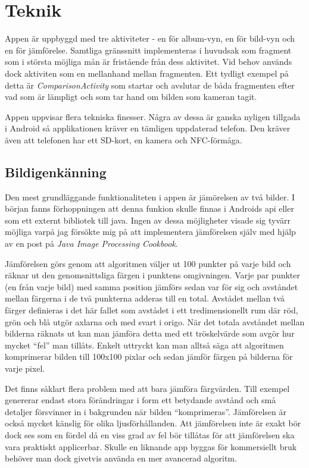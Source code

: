 \documentclass[11px, a4paper, twocolumn]{article}
\begin{document}
\section{Teknik}

	Appen är uppbyggd med tre aktiviteter - en för album-vyn, en för bild-vyn och en för jämförelse.	Samtliga gränssnitt implementeras i huvudsak som fragment som i största möjliga mån är fristående från dess aktivitet. Vid behov används dock aktiviten som en mellanhand mellan fragmenten\cite{FragmentCommunication}. Ett tydligt exempel på detta är \emph{ComparisonActivity} som startar och avslutar de båda fragmenten efter vad som är lämpligt och som tar hand om bilden som kameran tagit.

	Appen uppvisar flera tekniska finesser. Några av dessa är ganska nyligen tillgada i Android så applikationen kräver en tämligen uppdaterad telefon. Den kräver även att telefonen har ett SD-kort, en kamera och NFC-förmåga.

\subsection{Bildigenkänning}
\label{subsec:image_recog}
	Den mest grundläggande funktionaliteten i appen är jämörelsen av två bilder. I början fanns förhoppningen att denna funkion skulle finnas i Androids api eller som ett externt bibliotek till java. Ingen av dessa möjligheter visade sig tyvärr möjliga varpå jag försökte mig på att implementera jämförelsen själv med hjälp av en post på \emph{Java Image Processing Cookbook}\cite{ImageComparison}.

	Jämförelsen görs genom att algoritmen väljer ut 100 punkter på varje bild och räknar ut den genomsnittsliga färgen i punktens omgivningen. Varje par punkter (en från varje bild) med samma position jämförs sedan var för sig och avståndet mellan färgerna i de två punkterna adderas till en total. Avstådet mellan två färger definieras i det här fallet som avstådet i ett tredimensionellt rum där röd, grön och blå utgör axlarna och med svart i origo. När det totala avståndet mellan bilderna räknats ut kan man jämföra detta med ett tröskelvärde som avgör hur mycket ``fel'' man tillåts. Enkelt uttryckt kan man alltså säga att algoritmen komprimerar bilden till 100x100 pixlar och sedan jämför färgen på bilderna för varje pixel.

	Det finns såklart flera problem med att bara jämföra färgvärden. Till exempel genererar endast stora förändringar i form ett betydande avstånd och små detaljer försvinner in i bakgrunden när bilden ``komprimeras''. Jämförelsen är också mycket känslig för olika ljusförhållanden. Att jämförelsen inte är exakt bör dock ses som en fördel då en viss grad av fel bör tillåtas för att jämförelsen ska vara praktiskt applicerbar. Skulle en liknande app byggas för kommersiellt bruk behöver man dock givetvis använda en mer avancerad algoritm.
\end{document}
